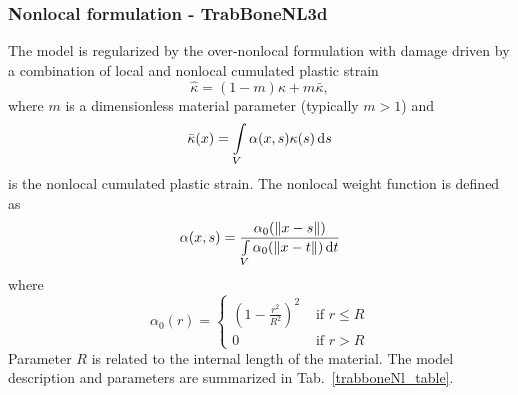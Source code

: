 \documentclass[a4paper]{article}
\begin{document}
\subsubsection{Nonlocal formulation - TrabBoneNL3d}
The model is regularized by the over-nonlocal formulation with damage driven by a combination of local and nonlocal cumulated plastic strain
\begin{equation}\label{overKappa}
\hat{\kappa} = (1-m)\kappa + m\bar{\kappa},
\end{equation}
where $m$ is a dimensionless material parameter (typically $m>1$) and
\begin{equation}\label{nonLocalPlStrain}
\bar{\kappa}(x) = \int\limits_V \alpha(x,s)\kappa(s)\,{\rm d}s
\end{equation}
is the nonlocal cumulated plastic strain. The nonlocal weight function is defined as
\begin{equation}
\alpha(x,s) = \frac{\alpha_0(\Vert x-s\Vert )}{\int\limits_V\alpha_0(\Vert x-t\Vert )\,{\rm d}t}
\end{equation}
where
\begin{equation}
\alpha_0(r) =\left\{\begin{array}{cc} \left(1-\frac{r^2}{R^2}\right)^2 & \mbox{ if } r\le R \\ 0 & \mbox{ if } r> R \end{array}\right.
\end{equation}
Parameter $R$ is related to the internal length of the material.
The model description and parameters are summarized in Tab.~\ref{trabboneNl_table}.
\end{document}
